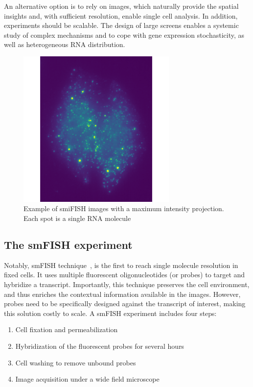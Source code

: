 An alternative option is to rely on images, which naturally provide the spatial insights and, with sufficient resolution, enable single cell analysis.
In addition, experiments should be scalable.
The design of large screens enables a systemic study of complex mechanisms and to cope with gene expression stochasticity, as well as heterogeneous \ac{RNA} distribution.

\begin{figure}[]
    \centering
    \includegraphics[width=0.7\textwidth]{figures/introduction/multichannel_input}
	\caption[Example of smiFISH image]{Example of smiFISH images with a maximum intensity projection.
	Each spot is a single RNA molecule}
    \label{fig:smFISH_input}
\end{figure}

\subsection{The smFISH experiment}
\label{subsec:intro_smfish}

Notably, \ac{smFISH} technique~\cite{Femino_1998}, is the first to reach single molecule resolution in fixed cells.
It uses multiple fluorescent oligonucleotides (or probes) to target and hybridize a transcript.
Importantly, this technique preserves the cell environment, and thus enriches the contextual information available in the images.
However, probes need to be specifically designed against the transcript of interest, making this solution costly to scale.
A \ac{smFISH} experiment includes four steps:

\begin{enumerate}
	\setlength\itemsep{0.1em}
	\item Cell fixation and permeabilization
	\item Hybridization of the fluorescent probes for several hours
	\item Cell washing to remove unbound probes
	\item Image acquisition under a wide field microscope
\end{enumerate}

